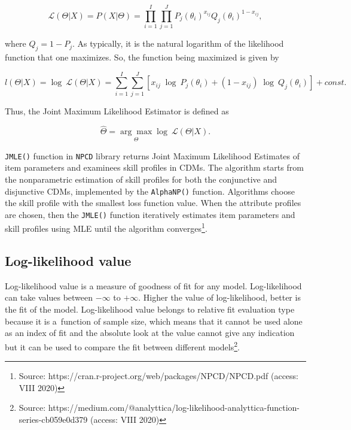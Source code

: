 \documentclass[english]{pwr_wmat_praca_dyplomowa}
\theoremstyle{plain}
\theoremstyle{definition}
\numberwithin{theorem}{chapter}
\begin{document}
\begin{equation}
	\mathcal{L}(\Theta|X) = P(X|\Theta) = \prod_{i=1}^{I} \prod_{j=1}^{J} P_j (\theta_i)^{x_{ij}} Q_j(\theta_i)^{1-x_{ij}},
\end{equation}

\noindent where $Q_j = 1 - P_j$. As typically, it is the natural logarithm of the likelihood function that one maximizes. So, the function being maximized is given by

\begin{equation}
	l(\Theta|X) = \log\: \mathcal{L}(\Theta|X) = \sum_{i=1}^{I} \sum_{j=1}^{J} \left[ x_{ij}\; \log\: P_j(\theta_i) + (1-x_{ij})\; \log\:  Q_j(\theta_i) \right] + const.
\end{equation}

\noindent Thus, the Joint Maximum Likelihood Estimator is defined \cite{jmle2} as

\begin{equation}
	\hat{\Theta} = \underset{\Theta}{\arg\max} \log\: \mathcal{L}(\Theta|X). 
\end{equation}

\texttt{JMLE()} function in \texttt{NPCD} library returns Joint Maximum Likelihood Estimates of item parameters and examinees skill profiles in CDMs. The algorithm starts from the nonparametric estimation of skill profiles for both the conjunctive and disjunctive CDMs, implemented by the \texttt{AlphaNP()} function. Algorithms choose the skill profile with the smallest loss function value. When the attribute profiles are chosen, then the \texttt{JMLE()} function iteratively estimates item parameters and skill profiles using MLE until the algorithm converges\footnote{Source: https://cran.r-project.org/web/packages/NPCD/NPCD.pdf (access: VIII 2020)}.

\subsection{Log-likelihood value}

Log-likelihood value is a measure of goodness of fit for any model. Log-likelihood can take values between $-\infty$ to $+\infty$. Higher the value of log-likelihood, better is the fit of the model. Log-likelihood value belongs to relative fit evaluation type because it is a~function of sample size, which means that it cannot be used alone as an index of fit and the absolute look at the value cannot give any indication but it can be used to compare the fit between different models\footnote{Source: https://medium.com/@analyttica/log-likelihood-analyttica-function-series-cb059e0d379 (access: VIII 2020)}. 
\end{document}
